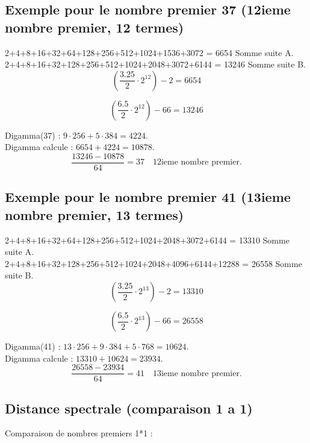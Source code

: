 \documentclass[a4paper,11pt]{article}
\begin{document}
\bigskip

\subsection*{Exemple pour le nombre premier 37 (12ieme nombre premier, 12 termes)}

2+4+8+16+32+64+128+256+512+1024+1536+3072 = 6654 Somme suite A.\\
2+4+8+16+32+128+256+512+1024+2048+3072+6144 = 13246 Somme suite B.\\

\[
\left(\frac{3.25}{2} \cdot 2^{12}\right) - 2 = 6654
\]

\[
\left(\frac{6.5}{2} \cdot 2^{12}\right) - 66 = 13246
\]

Digamma(37) : \(9 \cdot 256 + 5 \cdot 384 = 4224\).\\
Digamma calcule : \(6654 + 4224 = 10878\).\\

\[
\frac{13246 - 10878}{64} = 37 \quad \text{12ieme nombre premier.}
\]

\bigskip

\subsection*{Exemple pour le nombre premier 41 (13ieme nombre premier, 13 termes)}

2+4+8+16+32+64+128+256+512+1024+2048+3072+6144 = 13310 Somme suite A.\\
2+4+8+16+32+128+256+512+1024+2048+4096+6144+12288 = 26558 Somme suite B.\\

\[
\left(\frac{3.25}{2} \cdot 2^{13}\right) - 2 = 13310
\]

\[
\left(\frac{6.5}{2} \cdot 2^{13}\right) - 66 = 26558
\]

Digamma(41) : \(13 \cdot 256 + 9 \cdot 384 + 5 \cdot 768 = 10624\).\\
Digamma calcule : \(13310 + 10624 = 23934\).\\

\[
\frac{26558 - 23934}{64} = 41 \quad \text{13ieme nombre premier.}
\]

\bigskip

\subsection*{Distance spectrale (comparaison 1 a 1)}

Comparaison de nombres premiers 1*1 :
\end{document}
